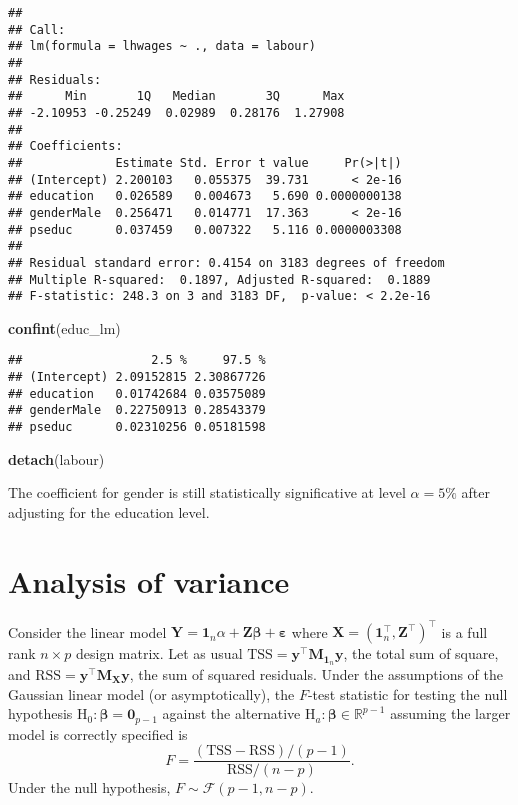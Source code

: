 \documentclass[]{book}
\newenvironment{Shaded}{\begin{snugshade}}{\end{snugshade}}
\newcommand{\KeywordTok}[1]{\textcolor[rgb]{0.13,0.29,0.53}{\textbf{#1}}}
\newcommand{\NormalTok}[1]{#1}
\theoremstyle{definition}
\theoremstyle{definition}
\theoremstyle{definition}
\theoremstyle{remark}
\begin{document}
\begin{verbatim}
## 
## Call:
## lm(formula = lhwages ~ ., data = labour)
## 
## Residuals:
##      Min       1Q   Median       3Q      Max 
## -2.10953 -0.25249  0.02989  0.28176  1.27908 
## 
## Coefficients:
##             Estimate Std. Error t value     Pr(>|t|)
## (Intercept) 2.200103   0.055375  39.731      < 2e-16
## education   0.026589   0.004673   5.690 0.0000000138
## genderMale  0.256471   0.014771  17.363      < 2e-16
## pseduc      0.037459   0.007322   5.116 0.0000003308
## 
## Residual standard error: 0.4154 on 3183 degrees of freedom
## Multiple R-squared:  0.1897, Adjusted R-squared:  0.1889 
## F-statistic: 248.3 on 3 and 3183 DF,  p-value: < 2.2e-16
\end{verbatim}

\begin{Shaded}
\begin{Highlighting}[]
\KeywordTok{confint}\NormalTok{(educ_lm)}
\end{Highlighting}
\end{Shaded}

\begin{verbatim}
##                  2.5 %     97.5 %
## (Intercept) 2.09152815 2.30867726
## education   0.01742684 0.03575089
## genderMale  0.22750913 0.28543379
## pseduc      0.02310256 0.05181598
\end{verbatim}

\begin{Shaded}
\begin{Highlighting}[]
\KeywordTok{detach}\NormalTok{(labour)}
\end{Highlighting}
\end{Shaded}

The coefficient for gender is still statistically significative at level
\(\alpha=5\%\) after adjusting for the education level.

\hypertarget{analysis-of-variance}{%
\chapter{Analysis of variance}\label{analysis-of-variance}}

Consider the linear model
\(\boldsymbol{Y} = \mathbf{1}_n\alpha + \mathbf{Z}\boldsymbol{\beta} + \boldsymbol{\varepsilon}\)
where \(\mathbf{X}=(\mathbf{1}_n^\top, \mathbf{Z}^\top)^\top\) is a full
rank \(n \times p\) design matrix. Let as usual
\(\mathrm{TSS} = \boldsymbol{y}^\top\mathbf{M}_{\mathbf{1}_n}\boldsymbol{y}\),
the total sum of square, and
\(\mathrm{RSS}= \boldsymbol{y}^\top\mathbf{M}_{\mathbf{X}}\boldsymbol{y}\),
the sum of squared residuals. Under the assumptions of the Gaussian
linear model (or asymptotically), the \(F\)-test statistic for testing
the null hypothesis
\(\mathrm{H}_0: \boldsymbol{\beta}=\mathbf{0}_{p-1}\) against the
alternative \(\mathrm{H}_a: \boldsymbol{\beta} \in \mathbb{R}^{p-1}\)
assuming the larger model is correctly specified is
\[F = \frac{(\mathrm{TSS}-\mathrm{RSS})/(p-1)}{\mathrm{RSS}/(n-p)}.\]
Under the null hypothesis, \(F \sim \mathcal{F}(p-1, n-p)\).
\end{document}
